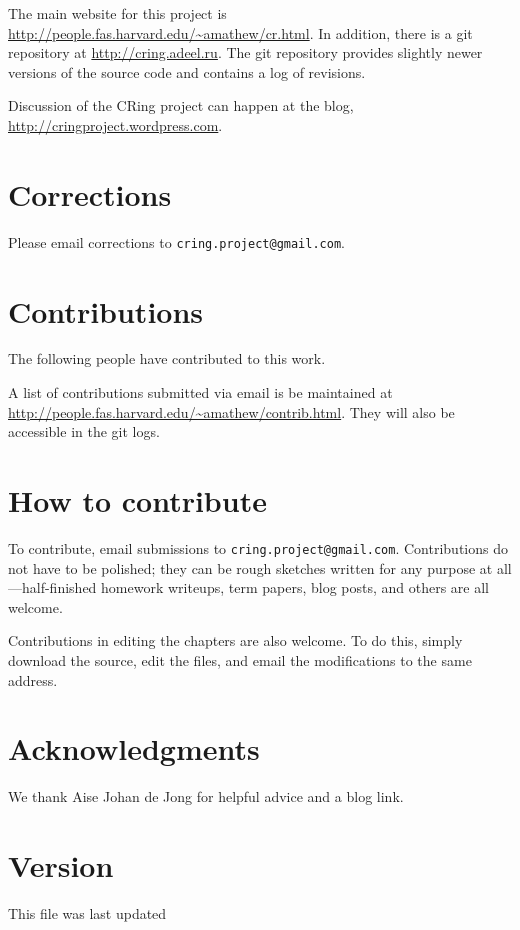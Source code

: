 The main website for this project is 
\url{http://people.fas.harvard.edu/~amathew/cr.html}. In addition, there is a
git repository at \url{http://cring.adeel.ru}. The git repository provides
slightly newer versions of the source code and contains a log of revisions.

Discussion of the CRing project can happen at the  blog,
\url{http://cringproject.wordpress.com}.

\section*{Corrections}

Please email corrections to \texttt{cring.project@gmail.com}.

\section*{Contributions}

The following people have contributed to this work.

\vspace{5mm}
\vspace{5mm}

A list of contributions submitted via email is be maintained at 
\url{http://people.fas.harvard.edu/~amathew/contrib.html}.
They will also be accessible in the git logs.

\section*{How to contribute}

To contribute, email submissions to \texttt{cring.project@gmail.com}. 
Contributions do not have to be polished; they can be rough sketches written
for any purpose at all---half-finished homework writeups, term papers, blog
posts, and others are all welcome.

Contributions in editing the chapters are also welcome. To do this, simply
download the source, edit the files, and email the modifications to the same
address.

\section*{Acknowledgments}

We thank Aise Johan de Jong for helpful advice and a blog link.

\section*{Version}

This file was last updated 

\tableofcontents
